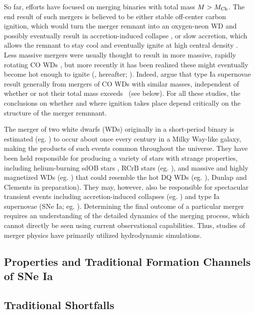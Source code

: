 So far, efforts have focused on merging binaries with total mass $M>\Mch$.  The end result of such mergers is believed to be either stable off-center carbon ignition, which would turn the merger remnant into an oxygen-neon WD and possibly eventually result in accretion-induced collapse \citep{saion98}, or slow accretion, which allows the remnant to stay cool and eventually ignite at high central density \citep{yoonpr07}.  Less massive mergers were usually thought to result in more massive, rapidly rotating CO WDs \citep{segrcm97,kube+10}, but more recently it has been realized these might eventually become hot enough to ignite (\citealt{vkercj10}, \citeal{vkercj10} hereafter; \citealt{shen+12,schw+12}).  Indeed, \citeal{vkercj10} argue that type Ia supernovae result generally from mergers of CO WDs with similar masses, independent of whether or not their total mass exceeds \Mch\ (see below).  For all these studies, the conclusions on whether and where ignition takes place depend critically on the structure of the merger remnnant.

The merger of two white dwarfs (WDs) originally in a short-period binary is estimated (eg. \citealt{badem12}) to occur about once every century in a Milky Way-like galaxy, making the products of such events common throughout the universe.  They have been held responsible for producing a variety of stars with strange properties, including helium-burning sdOB stars \citep{saioj00, justph11}, RCrB stars (eg. \citealt{webb84, clay+07, clay13}), and massive and highly magnetized WDs (eg. \citealt{segrcm97, garc+12, kule+13}) that could resemble the hot DQ WDs (eg. \citealt{dunlc15}), Dunlap and Clements in preparation).  They may, however, also be responsible for spectacular transient events including accretion-induced collapses (eg. \citealt{saion85, abdi+10}) and type Ia supernovae (SNe Ia; eg. \citealt{howe11, hill+13, maozmn14}).  Determining the final outcome of a particular merger requires an understanding of the detailed dynamics of the merging process, which cannot directly be seen using current observational capabilities.  Thus, studies of merger physics have primarily utilized hydrodynamic simulations.


\subsection{Properties and Traditional Formation Channels of SNe Ia}
\label{ssec:old_typeia}

\subsection{Traditional Shortfalls}

